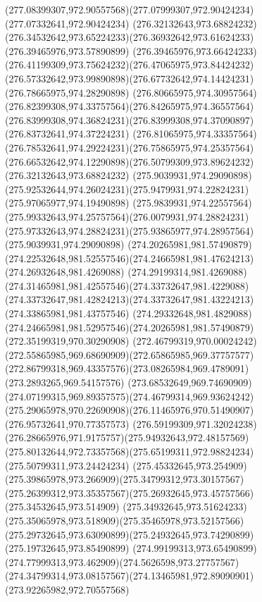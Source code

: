 {{		\curveto(277.08399307,972.90557568)(277.07999307,972.90424234)(277.07332641,972.90424234)
		\moveto(276.32132643,973.68824232)
		\curveto(276.34532642,973.65224233)(276.36932642,973.61624233)(276.39465976,973.57890899)
		\curveto(276.39465976,973.66424233)(276.41199309,973.75624232)(276.47065975,973.84424232)
		\curveto(276.57332642,973.99890898)(276.67732642,974.14424231)(276.78665975,974.28290898)
		\curveto(276.80665975,974.30957564)(276.82399308,974.33757564)(276.84265975,974.36557564)
		\curveto(276.83999308,974.36824231)(276.83999308,974.37090897)(276.83732641,974.37224231)
		\curveto(276.81065975,974.33357564)(276.78532641,974.29224231)(276.75865975,974.25357564)
		\curveto(276.66532642,974.12290898)(276.50799309,973.89624232)(276.32132643,973.68824232)
		\moveto(275.9039931,974.29090898)
		\curveto(275.92532644,974.26024231)(275.9479931,974.22824231)(275.97065977,974.19490898)
		\curveto(275.9839931,974.22557564)(275.99332643,974.25757564)(276.0079931,974.28824231)
		\curveto(275.97332643,974.28824231)(275.93865977,974.28957564)(275.9039931,974.29090898)
		\moveto(274.20265981,981.57490879)
		\curveto(274.22532648,981.52557546)(274.24665981,981.47624213)(274.26932648,981.4269088)
		\curveto(274.29199314,981.4269088)(274.31465981,981.42557546)(274.33732647,981.4229088)
		\curveto(274.33732647,981.42824213)(274.33732647,981.43224213)(274.33865981,981.43757546)
		\curveto(274.29332648,981.4829088)(274.24665981,981.52957546)(274.20265981,981.57490879)
		\moveto(272.35199319,970.30290908)
		\curveto(272.46799319,970.00024242)(272.55865985,969.68690909)(272.65865985,969.37757577)
		\curveto(272.86799318,969.43357576)(273.08265984,969.4789091)(273.2893265,969.54157576)
		\curveto(273.68532649,969.74690909)(274.07199315,969.89357575)(274.46799314,969.93624242)
		\curveto(275.29065978,970.22690908)(276.11465976,970.51490907)(276.95732641,970.77357573)
		\curveto(276.59199309,971.32024238)(276.28665976,971.9175757)(275.94932643,972.48157569)
		\curveto(275.80132644,972.73357568)(275.65199311,972.98824234)(275.50799311,973.24424234)
		\curveto(275.45332645,973.254909)(275.39865978,973.266909)(275.34799312,973.30157567)
		\curveto(275.26399312,973.35357567)(275.26932645,973.45757566)(275.34532645,973.514909)
		\curveto(275.34932645,973.51624233)(275.35065978,973.518909)(275.35465978,973.52157566)
		\curveto(275.29732645,973.63090899)(275.24932645,973.74290899)(275.19732645,973.85490899)
		\curveto(274.99199313,973.65490899)(274.77999313,973.462909)(274.5626598,973.27757567)
		\curveto(274.34799314,973.08157567)(274.13465981,972.89090901)(273.92265982,972.70557568)
}}
